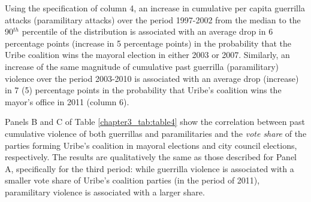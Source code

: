 \begin{table}[htbp]
\def\sym#1{\ifmmode^{#1}\else\(^{#1}\)\fi}\caption{Mechanisms: Direct capture, Cumulative violence and electoral outcomes}
\label{chapter3_tab:table4}
\begin{center}
\end{center}
\end{table}

Using the specification of column 4, an increase in cumulative per capita guerrilla attacks (paramilitary attacks) over the period 1997-2002 from the median to the 90$^{th}$ percentile of the distribution is associated with an average drop in 6 percentage points (increase in 5 percentage points) in the probability that the Uribe coalition wins the mayoral election in either 2003 or 2007. Similarly, an increase of the same magnitude of cumulative past guerrilla (paramilitary) violence over the period 2003-2010 is associated with an average drop (increase) in 7 (5) percentage points in the probability that Uribe's coalition wins the mayor's office in 2011 (column 6).

Panels B and C of Table \ref{chapter3_tab:table4} show the correlation between past cumulative violence of both guerrillas and paramilitaries and the {\it vote share} of the parties forming Uribe's coalition in mayoral elections and city council elections, respectively. The results are qualitatively the same as those described for Panel A, specifically for the third period: while guerrilla violence is associated with a smaller vote share of Uribe's coalition parties (in the period of 2011), paramilitary violence is associated with a larger share.

